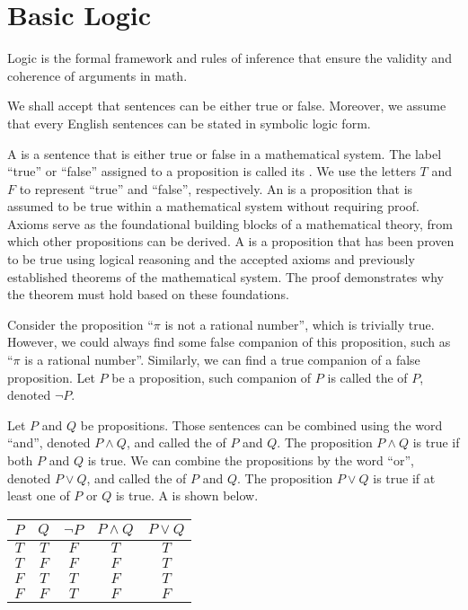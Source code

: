 \documentclass[10pt]{article}
\begin{document}
\section{Basic Logic}
Logic is the formal framework and rules of inference that ensure the validity and coherence of arguments in math. 
\begin{remark}
    We shall accept that sentences can be either true or false. Moreover, we assume that every English sentences can be stated in symbolic logic form.
\end{remark} 
\par
A  is a sentence that is either true or false in a mathematical system. The label ``true'' or ``false'' assigned to a proposition is called its . We use the letters $T$ and $F$ to represent ``true'' and ``false'', respectively. An  is a proposition that is assumed to be true within a mathematical system without requiring proof. Axioms serve as the foundational building blocks of a mathematical theory, from which other propositions can be derived. A  is a proposition that has been proven to be true using logical reasoning and the accepted axioms and previously established theorems of the mathematical system. The proof demonstrates why the theorem must hold based on these foundations.
\par
Consider the proposition ``$\pi$ is not a rational number'', which is trivially true. However, we could always find some false companion of this proposition, such as ``$\pi$ is a rational number''. Similarly, we can find a true companion of a false proposition. Let $P$ be a proposition, such companion of $P$ is called the  of $P$, denoted $\neg P$.
\par
Let $P$ and $Q$ be propositions. Those sentences can be combined using the word ``and'', denoted $P\wedge Q$, and called the  of $P$ and $Q$. The proposition $P\wedge Q$ is true if both $P$ and $Q$ is true. We can combine the propositions by the word ``or'', denoted $P\vee Q$, and called the  of $P$ and $Q$. The proposition $P\vee Q$ is true if at least one of $P$ or $Q$ is true. A  is shown below.
\begin{center}
    \begin{tabular}{cc|ccc}
        $P$ & $Q$ & $\neg P$ & $P\wedge Q$ & $P\vee Q$ \\
        \hline
        $T$ & $T$ & $F$ & $T$ & $T$ \\
        $T$ & $F$ & $F$ & $F$ & $T$ \\
        $F$ & $T$ & $T$ & $F$ & $T$ \\
        $F$ & $F$ & $T$ & $F$ & $F$ \\
    \end{tabular}
\end{center}
\end{document}
